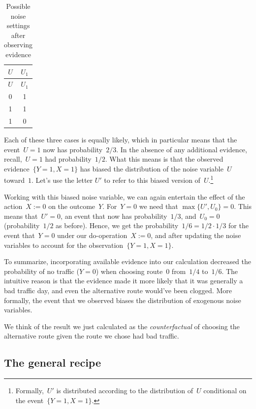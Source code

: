 \documentclass{tufte-book}
\begin{document}
\begin{longtable}[]{@{}cc@{}}
\caption{Possible noise settings after observing
evidence}\tabularnewline
\toprule
\(U\) & \(U_1\) \\
\midrule
\endfirsthead
\toprule
\(U\) & \(U_1\) \\
\midrule
\endhead
0 & 1 \\
1 & 1 \\
1 & 0 \\
\bottomrule
\end{longtable}

Each of these three cases is equally likely, which in particular means
that the event~\(U=1\) now has probability~\(2/3.\) In the absence of
any additional evidence, recall,~\(U=1\) had probability~\(1/2.\) What
this means is that the observed evidence~\(\{Y=1, X=1\}\) has biased the
distribution of the noise variable~\(U\) toward~\(1\). Let's use the
letter \(U'\) to refer to this biased version of~\(U\).\footnote{Formally,~\(U'\)
  is distributed according to the distribution of~\(U\) conditional on
  the event~\(\{Y=1, X=1\}.\)}

Working with this biased noise variable, we can again entertain the
effect of the action~\(X:=0\) on the outcome~\(Y\). For~\(Y=0\) we need
that \(\max\{U', U_0\}=0.\) This means that~\(U'=0\), an event that now
has probability~\(1/3\), and~\(U_0=0\) (probability~\(1/2\) as before).
Hence, we get the probability~\(1/6=1/2\cdot 1/3\) for the event
that~\(Y=0\) under our do-operation~\(X:=0\), and after updating the
noise variables to account for the observation~\(\{Y=1, X=1\}\).

To summarize, incorporating available evidence into our calculation
decreased the probability of no traffic (\(Y=0\)) when choosing
route~\(0\) from~\(1/4\) to~\(1/6\). The intuitive reason is that the
evidence made it more likely that it was generally a bad traffic day,
and even the alternative route would've been clogged. More formally, the
event that we observed biases the distribution of exogenous noise
variables.

We think of the result we just calculated as the \emph{counterfactual}
of choosing the alternative route given the route we chose had bad
traffic.

\hypertarget{the-general-recipe}{%
\subsection{The general recipe}\label{the-general-recipe}}
\end{document}
